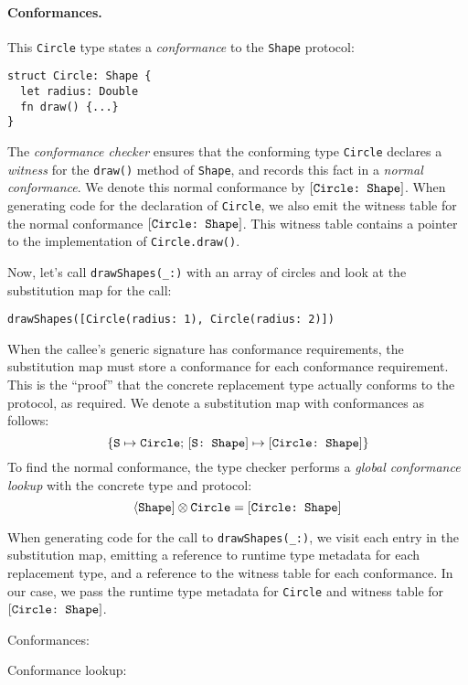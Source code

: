 \documentclass[../generics]{subfiles}
\begin{document}
\paragraph{Conformances.} This \texttt{Circle} type states a \emph{conformance} to the \texttt{Shape} protocol:
\begin{Verbatim}
struct Circle: Shape {
  let radius: Double
  fn draw() {...}
}
\end{Verbatim}
The \emph{conformance checker} ensures that the conforming type \texttt{Circle} declares a \emph{witness} for the \texttt{draw()} method of \texttt{Shape}, and records this fact in a \emph{normal conformance}. We denote this normal conformance by $[\texttt{Circle:~Shape}]$. When generating code for the declaration of \texttt{Circle}, we also emit the witness table for the normal conformance $[\texttt{Circle:~Shape}]$. This witness table contains a pointer to the implementation of \texttt{Circle.draw()}.

Now, let's call \verb|drawShapes(_:)| with an array of circles and look at the substitution map for the call:
\begin{Verbatim}
drawShapes([Circle(radius: 1), Circle(radius: 2)])
\end{Verbatim}
When the callee's generic signature has conformance requirements, the substitution map must store a conformance for each conformance requirement. This is the ``proof'' that the concrete replacement type actually conforms to the protocol, as required. We denote a substitution map with conformances as follows:
\[\{\texttt{S} \mapsto \texttt{Circle};\,[\texttt{S:~Shape}] \mapsto [\texttt{Circle:~Shape}]\}\]
To find the normal conformance, the type checker performs a \emph{global conformance lookup} with the concrete type and protocol:
\[\langle\texttt{Shape}]\otimes\texttt{Circle}=[\texttt{Circle:~Shape}]\]

When generating code for the call to \verb|drawShapes(_:)|, we visit each entry in the substitution map, emitting a reference to runtime type metadata for each replacement type, and a reference to the witness table for each conformance. In our case, we pass the runtime type metadata for \texttt{Circle} and witness table for $[\texttt{Circle:~Shape}]$.

\begin{MoreDetails}
\item Conformances: 
\item Conformance lookup: 
\end{MoreDetails}
\end{document}
